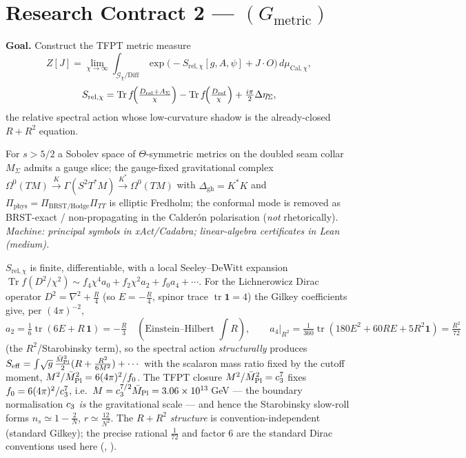 \section*{Research Contract 2 --- $(G_{\mathrm{metric}})$}
\noindent\textbf{Goal.} Construct the TFPT metric measure
\[
  Z[J]=\lim_{\chi\to\infty}\int_{\mathcal G_\chi/\mathrm{Diff}}
  \exp\!\bigl(-S_{\mathrm{rel},\chi}[g,A,\psi]+J\!\cdot\!O\bigr)\,d\mu_{\mathrm{Cal},\chi},
\]
\[
  S_{\mathrm{rel},\chi}=\operatorname{Tr}f\!\Bigl(\tfrac{D_{\mathrm{rel}}+A_\Sigma}{\chi}\Bigr)
  -\operatorname{Tr}f\!\Bigl(\tfrac{D_{\mathrm{ref}}}{\chi}\Bigr)+\tfrac{i\pi}{2}\Delta\eta_\Sigma,
\]
the relative spectral action whose low-curvature shadow is the already-closed $R+R^2$ equation.

\begin{lemma}
For $s>5/2$ a Sobolev space of $\Theta$-symmetric metrics on the doubled seam collar $M_\Sigma$ admits a
gauge slice; the gauge-fixed gravitational complex
$\Omega^0(TM)\xrightarrow{K}\Gamma(S^2T^*M)\xrightarrow{K^*}\Omega^0(TM)$ with
$\Delta_{\mathrm{gh}}=K^*K$ and $\Pi_{\mathrm{phys}}=\Pi_{\mathrm{BRST/Hodge}}\Pi_{TT}$ is elliptic
Fredholm; the conformal mode is removed as BRST-exact / non-propagating in the Calderón polarisation
(\emph{not} rhetorically). \emph{Machine: principal symbols in xAct/Cadabra; linear-algebra certificates
in Lean (medium).}
\end{lemma}

\begin{lemma}
$S_{\mathrm{rel},\chi}$ is finite, differentiable, with a local Seeley--DeWitt expansion
$\operatorname{Tr}f(D^2/\chi^2)\sim f_4\chi^4 a_0+f_2\chi^2 a_2+f_0 a_4+\cdots$. For the Lichnerowicz
Dirac operator $D^2=\nabla^2+\tfrac R4$ (so $E=-\tfrac R4$, spinor trace $\operatorname{tr}\mathbf1=4$) the
Gilkey coefficients give, per $(4\pi)^{-2}$,
\[
  a_2=\tfrac16\operatorname{tr}(6E+R\,\mathbf1)=-\tfrac R3
  \quad(\text{Einstein--Hilbert }\textstyle\int\!R),\qquad
  a_4\big|_{R^2}=\tfrac1{360}\operatorname{tr}(180E^2{+}60RE{+}5R^2\mathbf1)=\tfrac{R^2}{72}
\]
(the $R^2$/Starobinsky term), so the spectral action \emph{structurally} produces
$S_{\mathrm{eff}}=\int\!\sqrt g\,\tfrac{\bar M_{\mathrm{Pl}}^2}{2}(R+\tfrac{R^2}{6M^2})+\cdots$ with the scalaron mass ratio
fixed by the cutoff moment, $M^2/\bar M_{\mathrm{Pl}}^2=6(4\pi)^2/f_0$. The TFPT closure $M^2/\bar M_{\mathrm{Pl}}^2=c_3^7$ fixes
$f_0=6(4\pi)^2/c_3^7$, i.e.\ $M=c_3^{7/2}\bar M_{\mathrm{Pl}}=3.06\times10^{13}\,$GeV --- the boundary normalisation
$c_3$ \emph{is} the gravitational scale --- and hence the Starobinsky slow-roll forms
$n_s\simeq1-\tfrac2N$, $r\simeq\tfrac{12}{N^2}$. The $R+R^2$ \emph{structure} is convention-independent
(standard Gilkey); the precise rational $\tfrac1{72}$ and factor $6$ are the standard Dirac conventions used
here (, ).
\end{lemma}

